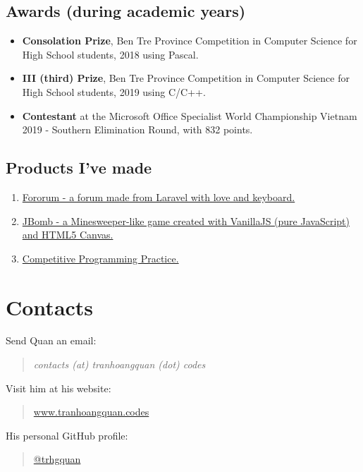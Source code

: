\documentclass{article}
\begin{document}
        \subsection{Awards (during academic years)}
            \begin{itemize}
                \item {\bfseries{Consolation Prize}}, Ben Tre Province Competition in Computer Science for High School students, 2018 using Pascal.
                \item {\bfseries{III (third) Prize}}, Ben Tre Province Competition in Computer Science for High School students, 2019 using C/C++.
                \item {\bfseries{Contestant}} at the Microsoft Office Specialist World Championship Vietnam 2019 - Southern Elimination Round, with 832 points.
            \end{itemize}

        \subsection{Products I've made}
            \begin{enumerate}
                \item \href{https://github.com/trhgquan/Fororum}{Fororum - a forum made from Laravel with love and keyboard.}
                \item \href{https://github.com/trhgquan/JBomb}{JBomb - a Minesweeper-like game created with VanillaJS (pure JavaScript) and HTML5 Canvas.}
                \item \href{https://github.com/trhgquan/CPP}{Competitive Programming Practice.}
            \end{enumerate}

    \section{Contacts}
        Send Quan an email:
        \begin{quote}
            \itshape{contacts (at) tranhoangquan (dot) codes}
        \end{quote}
        Visit him at his website:
        \begin{quote}
            \href{https://www.tranhoangquan.codes}{www.tranhoangquan.codes}
        \end{quote}
        His personal GitHub profile:
        \begin{quote}
            \href{https://github.com/trhgquan}{@trhgquan}
        \end{quote}
\end{document}
